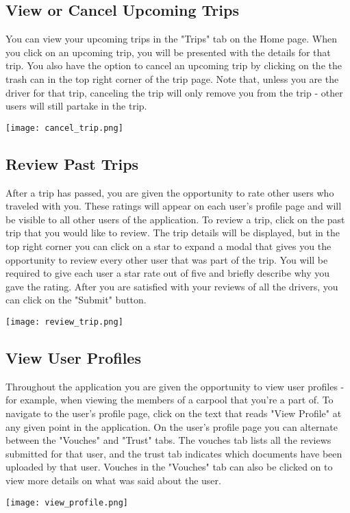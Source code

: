 \documentclass[12pt]{article}
\begin{document}
\subsection{View or Cancel Upcoming Trips}
You can view your upcoming trips in the "Trips" tab on the Home page. When you click on an upcoming trip, you will be presented with the details for that trip. You also have the option to cancel an upcoming trip by clicking on the the trash can in the top right corner of the trip page. Note that, unless you are the driver for that trip, canceling the trip will only remove you from the trip - other users will still partake in the trip.
\begin{center}
\texttt{[image: cancel\_trip.png]}
\end{center}

\subsection{Review Past Trips}
After a trip has passed, you are given the opportunity to rate other users who traveled with you. These ratings will appear on each user's profile page and will be visible to all other users of the application. To review a trip, click on the past trip that you would like to review. The trip details will be displayed, but in the top right corner you can click on a star to expand a modal that gives you the opportunity to review every other user that was part of the trip. You will be required to give each user a star rate out of five and briefly describe why you gave the rating. After you are satisfied with your reviews of all the drivers, you can click on the "Submit" button. 
\begin{center}
\texttt{[image: review\_trip.png]}
\end{center}

\subsection{View User Profiles}
Throughout the application you are given the opportunity to view user profiles - for example, when viewing the members of a carpool that you're a part of. To navigate to the user's profile page, click on the text that reads "View Profile" at any given point in the application. On  the user's profile page you can alternate between the "Vouches" and "Trust" tabs. The vouches tab lists all the reviews submitted for that user, and the trust tab indicates which documents have been uploaded by that user. Vouches in the "Vouches" tab can also be clicked on to view more details on what was said about the user.
\begin{center}
\texttt{[image: view\_profile.png]}
\end{center}
\end{document}
